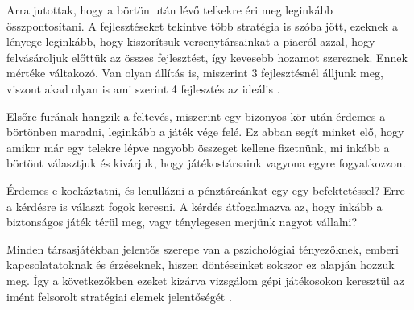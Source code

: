 Arra jutottak, hogy a börtön után lévő telkekre éri meg leginkább összpontosítani. A fejlesztéseket tekintve több stratégia is szóba jött, ezeknek a lényege leginkább, hogy kiszorítsuk versenytársainkat a piacról azzal, hogy felvásároljuk előttük az összes fejlesztést, így kevesebb hozamot szereznek. Ennek mértéke váltakozó. Van olyan állítás is, miszerint 3 fejlesztésnél álljunk meg, viszont akad olyan is ami szerint 4 fejlesztés az ideális \cite{koury2012monopoly}.


Elsőre furának hangzik a feltevés, miszerint egy bizonyos kör után érdemes a börtönben maradni, leginkább a játék vége felé. Ez abban segít minket elő, hogy amikor már egy telekre lépve nagyobb összeget kellene fizetnünk, mi inkább a börtönt választjuk és kivárjuk, hogy játékostársaink vagyona egyre fogyatkozzon.


Érdemes-e kockáztatni, és lenullázni a pénztárcánkat egy-egy befektetéssel? Erre a kérdésre is választ fogok keresni. A kérdés átfogalmazva az, hogy inkább a biztonságos játék térül meg, vagy ténylegesen merjünk nagyot vállalni?

Minden társasjátékban jelentős szerepe van a pszichológiai tényezőknek, emberi kapcsolatatoknak és érzéseknek, hiszen döntéseinket sokszor ez alapján hozzuk meg. Így a következőkben ezeket kizárva vizsgálom gépi játékosokon keresztül az imént felsorolt stratégiai elemek jelentőségét \cite{psychology}.
